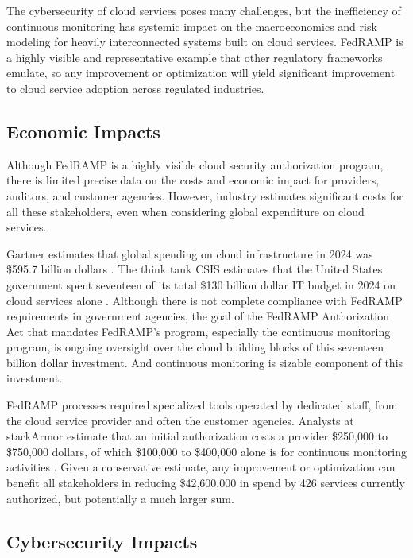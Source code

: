 \documentclass{jdf}
\begin{document}
The cybersecurity of cloud services poses many challenges, but the inefficiency of continuous monitoring has systemic impact on the macroeconomics and risk modeling for heavily interconnected systems built on cloud services. FedRAMP is a highly visible and representative example that other regulatory frameworks emulate, so any improvement or optimization will yield significant improvement to cloud service adoption across regulated industries.

\subsection{Economic Impacts}

Although FedRAMP is a highly visible cloud security authorization program, there is limited precise data on the costs and economic impact for providers, auditors, and customer agencies. However, industry estimates significant costs for all these stakeholders, even when considering global expenditure on cloud services.

Gartner estimates that global spending on cloud infrastructure in 2024 was \$595.7 billion dollars \citeyear{gartner24}. The think tank CSIS estimates that the United States government spent seventeen of its total \$130 billion dollar IT budget in 2024 on cloud services alone \citeyear[p.~1]{csis25}. Although there is not complete compliance with FedRAMP requirements in government agencies, the goal of the FedRAMP Authorization Act that mandates FedRAMP's program, especially the continuous monitoring program, is ongoing oversight over the cloud building blocks of this seventeen billion dollar investment. And continuous monitoring is sizable component of this investment.

FedRAMP processes required specialized tools operated by dedicated staff, from the cloud service provider and often the customer agencies. Analysts at stackArmor estimate that an initial authorization costs a provider \$250,000 to \$750,000 dollars, of which \$100,000 to \$400,000 alone is for continuous monitoring activities \citeyear{stackarmor24}. Given a conservative estimate, any improvement or optimization can benefit all stakeholders in reducing \$42,600,000 in spend by 426 services currently authorized, but potentially a much larger sum.

\subsection{Cybersecurity Impacts}
\end{document}
